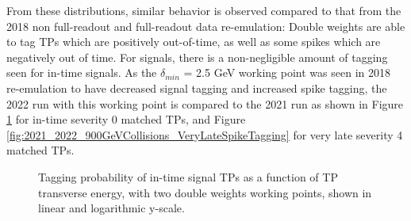 From these distributions, similar behavior is observed compared to that from the 2018 non full-readout and full-readout data re-emulation: Double weights are able to tag TPs which are positively out-of-time, as well as some spikes which are negatively out of time. For signals, there is a non-negligible amount of tagging seen for in-time signals. As the $\delta_{min}$ = 2.5 GeV working point was seen in 2018 re-emulation to have decreased signal tagging and increased spike tagging, the 2022 run with this working point is compared to the 2021 run as shown in Figure \ref{fig:2021_2022_900GeVCollisions_inTimeSignalTagging} for in-time severity 0 matched TPs, and Figure \ref{fig:2021_2022_900GeVCollisions_VeryLateSpikeTagging} for very late severity 4 matched TPs.

\begin{figure}[H]%
    \setcounter{subfigure}{0}
    \centering
    \hfill
    \caption{Tagging probability of in-time signal TPs as a function of TP transverse energy, with two double weights working points, shown in linear and logarithmic y-scale. \label{fig:2021_2022_900GeVCollisions_inTimeSignalTagging}}%
\end{figure}  

